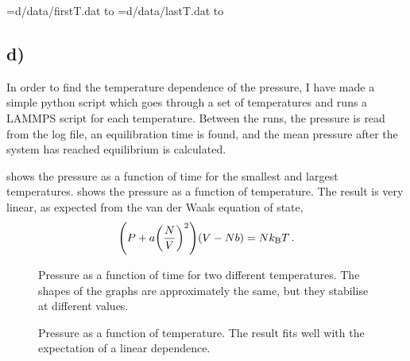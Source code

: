 \documentclass[11pt,british,a4paper]{report}
\begin{document}
\openin\infile=d/data/firstT.dat
\read\infile to \firstT
\closein\infile
\openin\infile=d/data/lastT.dat
\read\infile to \lastT
\closein\infile
\subsection*{d)}
In order to find the temperature dependence of the pressure, I have made a simple python script which goes through a set of temperatures and runs a LAMMPS script for each temperature.
Between the runs, the pressure is read from the log file, an equilibration time is found, and the mean pressure after the system has reached equilibrium is calculated.

 shows the pressure as a function of time for the smallest and largest temperatures.
 shows the pressure as a function of temperature. The result is very linear, as expected from the van der Waals equation of state,
\[
    \qty(P+a\qty(\frac{N}{V})^2)\qty(V-Nb) = Nk_\mathrm{B}T\,.
\]
\begin{figure}[htbp]
    \centering
    \caption{Pressure as a function of time for two different temperatures. The shapes of the graphs are approximately the same, but they stabilise at different values.}
    \label{fig:presstime}
\end{figure}
\begin{figure}[htbp]
    \centering
    \caption{Pressure as a function of temperature. The result fits well with the expectation of a linear dependence.}\label{fig:presstemp}
\end{figure}
\end{document}
